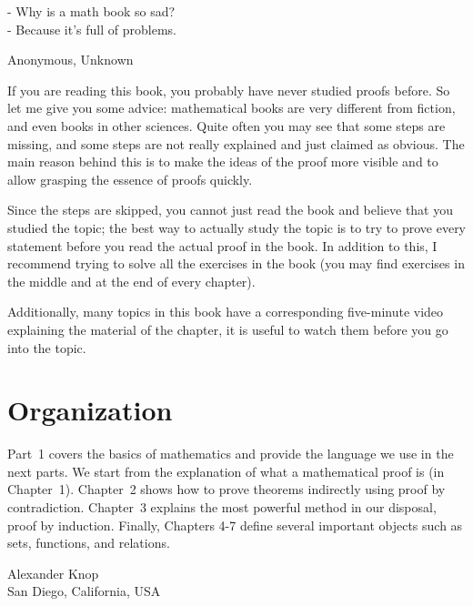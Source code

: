 \epigraph{
    - Why is a math book so sad? \\
    - Because it's full of problems.
}{Anonymous, Unknown}


If you are reading this book, you probably have never studied proofs before.
So let me give you some advice: mathematical books are very different from
fiction, and even books in other sciences. Quite often you may see that some
steps are missing, and some steps are not really explained and just claimed as
obvious. The main reason behind this is to make the ideas of the proof more
visible and to allow grasping the essence of proofs quickly.

Since the steps are skipped, you cannot just read the book and believe that you
studied the topic; the best way to actually study the topic is to try to prove
every statement before you read the actual proof in the book. In addition to
this, I recommend trying to solve all the exercises in the book (you may find
exercises in the middle and at the end of every chapter).

Additionally, many topics in this book have a corresponding five-minute video
explaining the material of the chapter, it is useful to watch them before you go
into the topic.

\section*{Organization}
Part~1 covers the basics of mathematics and provide the language we use in the
next parts. We start from the explanation of what a mathematical proof is (in
Chapter~1). Chapter~2 shows how to prove theorems indirectly using proof by
contradiction. Chapter~3 explains the most powerful method in our disposal,
proof by induction. Finally, Chapters 4-7 define several important objects such
as sets, functions, and relations.

\begin{flushright}
  Alexander Knop \\
  San Diego, California, USA
\end{flushright}
